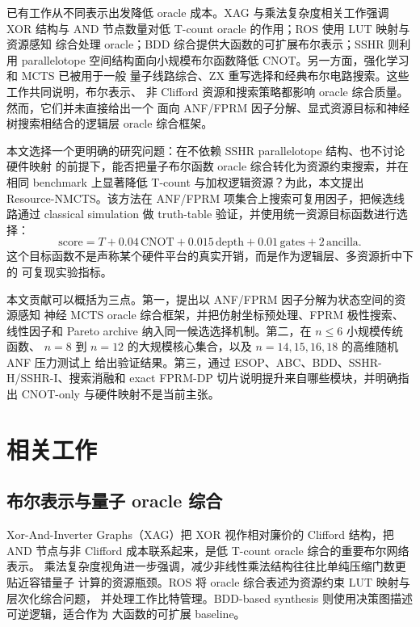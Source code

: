 \documentclass[UTF8,fontset=macnew,11pt]{ctexart}
\newcommand{\method}{Resource-NMCTS}
\newcommand{\score}{\mathrm{score}}
\begin{document}
已有工作从不同表示出发降低 oracle 成本。XAG 与乘法复杂度相关工作强调 XOR
结构与 AND 节点数量对低 T-count oracle 的作用；ROS 使用 LUT 映射与资源感知
综合处理 oracle；BDD 综合提供大函数的可扩展布尔表示；SSHR 则利用 parallelotope
空间结构面向小规模布尔函数降低 CNOT。另一方面，强化学习和 MCTS 已被用于一般
量子线路综合、ZX 重写选择和经典布尔电路搜索。这些工作共同说明，布尔表示、
非 Clifford 资源和搜索策略都影响 oracle 综合质量。然而，它们并未直接给出一个
面向 ANF/FPRM 因子分解、显式资源目标和神经树搜索相结合的逻辑层 oracle 综合框架。

本文选择一个更明确的研究问题：在不依赖 SSHR parallelotope 结构、也不讨论硬件映射
的前提下，能否把量子布尔函数 oracle 综合转化为资源约束搜索，并在相同 benchmark
上显著降低 T-count 与加权逻辑资源？为此，本文提出 \method{}。该方法在 ANF/FPRM
项集合上搜索可复用因子，把候选线路通过 classical simulation 做 truth-table
验证，并使用统一资源目标函数进行选择：
\begin{equation}
\score = T + 0.04\,\mathrm{CNOT} + 0.015\,\mathrm{depth}
       + 0.01\,\mathrm{gates} + 2\,\mathrm{ancilla}.
\end{equation}
这个目标函数不是声称某个硬件平台的真实开销，而是作为逻辑层、多资源折中下的
可复现实验指标。

本文贡献可以概括为三点。第一，提出以 ANF/FPRM 因子分解为状态空间的资源感知
神经 MCTS oracle 综合框架，并把仿射坐标预处理、FPRM 极性搜索、线性因子和
Pareto archive 纳入同一候选选择机制。第二，在 $n\leq 6$ 小规模传统函数、
$n=8$ 到 $n=12$ 的大规模核心集合，以及 $n=14,15,16,18$ 的高维随机 ANF 压力测试上
给出验证结果。第三，通过 ESOP、ABC、BDD、SSHR-H/SSHR-I、搜索消融和 exact FPRM-DP
切片说明提升来自哪些模块，并明确指出 CNOT-only 与硬件映射不是当前主张。

\section{相关工作}

\subsection{布尔表示与量子 oracle 综合}

Xor-And-Inverter Graphs（XAG）把 XOR 视作相对廉价的 Clifford 结构，把 AND
节点与非 Clifford 成本联系起来，是低 T-count oracle 综合的重要布尔网络表示。
乘法复杂度视角进一步强调，减少非线性乘法结构往往比单纯压缩门数更贴近容错量子
计算的资源瓶颈。ROS 将 oracle 综合表述为资源约束 LUT 映射与层次化综合问题，
并处理工作比特管理。BDD-based synthesis 则使用决策图描述可逆逻辑，适合作为
大函数的可扩展 baseline。
\end{document}
